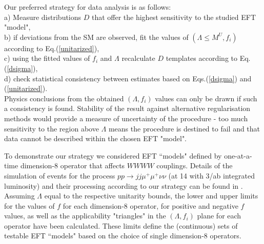 Our preferred strategy for data analysis is as follows:\\
a)  Measure  distributions $D$ that
offer the highest sensitivity to the studied EFT "model",\\
b) if deviations from the SM are observed, fit the values of 
$(\Lambda\leq M^U, f_i)$  according to 
Eq.(\ref{unitarized}),\\
c) using the fitted values of $f_i$ and $\Lambda$ recalculate 
$D$  templates 
according to 
Eq.(\ref{dsigma}),\\
d) check statistical consistency between estimates based on Eqs.(\ref{dsigma}) and (\ref{unitarized}). \\
 Physics conclusions from the obtained $(\Lambda, f_i)$ values can only be drawn
if such a consistency is found.  
%
%
Stability of the result against alternative 
regularisation methods  would provide a measure of uncertainty of the procedure - too much
sensitivity to the region above $\Lambda$ means the procedure is destined to fail
and  that data cannot be described within the chosen EFT "model".

%

To demonstrate our strategy we considered EFT ``models" defined by 
one-at-a-time dimension-8 operator that affects $WWWW$ couplings. Details of the simulation of events for  the process 
$pp \to jj\mu^+\mu^+\nu\nu$ (at 14 \UTeV with 3/ab integrated luminosity) and their processing according to our strategy can be found in \cite{Kalinowski:2018oxd}. 
Assuming $\Lambda$ equal to the respective unitarity bounds,
the lower and upper limits for the values of $f$ for each dimension-8 operator, for positive
and negative $f$ values, as well as the applicability "triangles" in the $(\Lambda,f_i)$ plane for each operator have been calculated.
  These limits define the (continuous) sets of testable 
EFT ``models" based on the choice of single dimension-8 operators. 


